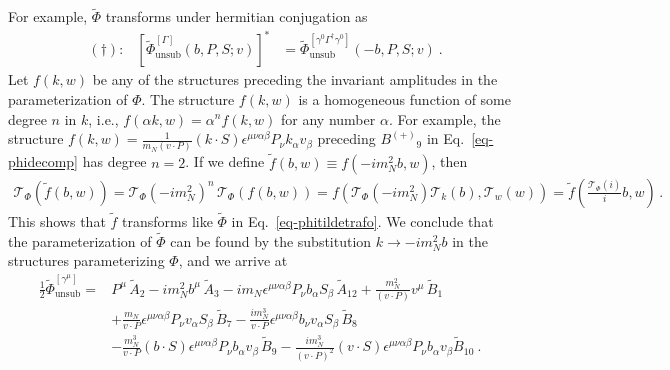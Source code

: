 \documentclass[]{article}
\numberwithin{equation}{section}
\newcommand{\GammaOp}{\Gamma}
\newcommand{\tcdot}{{\cdot}}
\newcommand{\tAmp}{\widetilde{A}}
\newcommand{\tBmp}{\widetilde{B}}
\newcommand{\Bmp}{\ensuremath{B^{(+)}}}
\newcommand{\mN}{m_N}
\newcommand{\kei}{k}
\newcommand{\elll}{b}
\begin{document}
For example, $\tilde \Phi$ transforms under hermitian conjugation as
\begin{align}
	&(\dagger): &\left[ \widetilde{\Phi}^{[\GammaOp]}_{\text{unsub}}(\elll,P,S;v)  \right]^* 
	&= \widetilde{\Phi}^{[\gamma^0 \GammaOp^\dagger \gamma^0]}_{\text{unsub}}(-\elll,P,S;v)  \ .\label{eq-conhermtilde}
\end{align}
Let $f(\kei,w)$ be any of the structures preceding the invariant amplitudes in the parameterization of $\Phi$.
The structure $f(\kei,w)$ is a homogeneous function of some degree $n$ in $\kei$, i.e., $f(\alpha \kei,w) = \alpha^n f(\kei,w)$ for any number $\alpha$. 
For example, the structure $f(\kei,w) = \frac{1}{\mN (v \tcdot P)} (\kei \tcdot S) \epsilon^{\mu \nu \alpha \beta} P_\nu \kei_\alpha v_\beta$ preceding $\Bmp_9$ in Eq.\ \eqref{eq-phidecomp} has degree $n=2$.
If we define $\tilde f(\elll,w) \equiv f(- i \mN^2 \elll,w)$, then 
\begin{align}
	\mathcal{T}_\Phi\left( \tilde f(\elll, w) \right) =
	\mathcal{T}_\Phi(-i \mN^2)^n\, \mathcal{T}_\Phi\left( f( \elll, w) \right) =
	f\left( \mathcal{T}_\Phi(-i \mN^2) \mathcal{T}_\kei(\elll) , \mathcal{T}_w(w) \right) =
	\tilde f \left(  \frac{\mathcal{T}_\Phi(i)}{i} \elll, w \right)\, .
	\end{align}
This shows that $\tilde f$ transforms like $\widetilde \Phi$ in Eq.\ \eqref{eq-phitildetrafo}.
We conclude that the parameterization of $\widetilde{\Phi}$ can be found by the substitution $\kei \rightarrow -i \mN^2 \elll$ in the structures parameterizing $\Phi$, and we arrive at 
\begin{align}  \frac{1}{2}\widetilde \Phi^{[\gamma^\mu]}_{\text{unsub}}  = & P^\mu\, \tAmp_2 - i \mN^2 \elll^\mu\, \tAmp_3 - i \mN \epsilon^{\mu \nu \alpha \beta} P_\nu \elll_\alpha S_\beta\, \tAmp_{12} + \frac{\mN^2}{(v \tcdot P)} v^\mu\, \tBmp_1\nonumber\\
& + \frac{\mN}{v \tcdot P} \epsilon^{\mu \nu \alpha \beta} P_\nu v_\alpha S_\beta\, \tBmp_7  - \frac{ i \mN^3}{v \tcdot P} \epsilon^{\mu \nu \alpha \beta} \elll_\nu v_\alpha S_\beta\, \tBmp_8 \nonumber\\
& - \frac{\mN^3}{v \tcdot P} (\elll \tcdot S) \epsilon^{\mu \nu \alpha \beta} P_\nu \elll_\alpha v_\beta\, \tBmp_9  - \frac{i \mN^3}{(v \tcdot P)^2} (v \tcdot S) \epsilon^{\mu \nu \alpha \beta} P_\nu \elll_\alpha v_\beta \tBmp_{10}\ . 
\label{eq-phitildedecomp}
\end{align}
\end{document}
